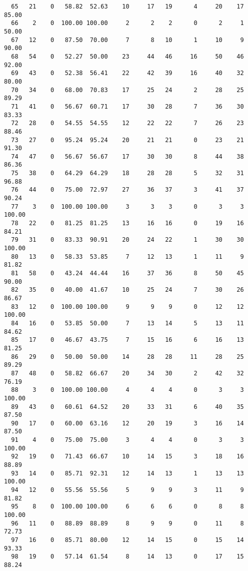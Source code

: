 \begin{verbatim}
  65   21    0   58.82  52.63    10     17   19      4     20    17    85.00
  66    2    0  100.00 100.00     2      2    2      0      2     1    50.00
  67   12    0   87.50  70.00     7      8   10      1     10     9    90.00
  68   54    0   52.27  50.00    23     44   46     16     50    46    92.00
  69   43    0   52.38  56.41    22     42   39     16     40    32    80.00
  70   34    0   68.00  70.83    17     25   24      2     28    25    89.29
  71   41    0   56.67  60.71    17     30   28      7     36    30    83.33
  72   28    0   54.55  54.55    12     22   22      7     26    23    88.46
  73   27    0   95.24  95.24    20     21   21      0     23    21    91.30
  74   47    0   56.67  56.67    17     30   30      8     44    38    86.36
  75   38    0   64.29  64.29    18     28   28      5     32    31    96.88
  76   44    0   75.00  72.97    27     36   37      3     41    37    90.24
  77    3    0  100.00 100.00     3      3    3      0      3     3   100.00
  78   22    0   81.25  81.25    13     16   16      0     19    16    84.21
  79   31    0   83.33  90.91    20     24   22      1     30    30   100.00
  80   13    0   58.33  53.85     7     12   13      1     11     9    81.82
  81   58    0   43.24  44.44    16     37   36      8     50    45    90.00
  82   35    0   40.00  41.67    10     25   24      7     30    26    86.67
  83   12    0  100.00 100.00     9      9    9      0     12    12   100.00
  84   16    0   53.85  50.00     7     13   14      5     13    11    84.62
  85   17    0   46.67  43.75     7     15   16      6     16    13    81.25
  86   29    0   50.00  50.00    14     28   28     11     28    25    89.29
  87   48    0   58.82  66.67    20     34   30      2     42    32    76.19
  88    3    0  100.00 100.00     4      4    4      0      3     3   100.00
  89   43    0   60.61  64.52    20     33   31      6     40    35    87.50
  90   17    0   60.00  63.16    12     20   19      3     16    14    87.50
  91    4    0   75.00  75.00     3      4    4      0      3     3   100.00
  92   19    0   71.43  66.67    10     14   15      3     18    16    88.89
  93   14    0   85.71  92.31    12     14   13      1     13    13   100.00
  94   12    0   55.56  55.56     5      9    9      3     11     9    81.82
  95    8    0  100.00 100.00     6      6    6      0      8     8   100.00
  96   11    0   88.89  88.89     8      9    9      0     11     8    72.73
  97   16    0   85.71  80.00    12     14   15      0     15    14    93.33
  98   19    0   57.14  61.54     8     14   13      0     17    15    88.24

\end{verbatim}
